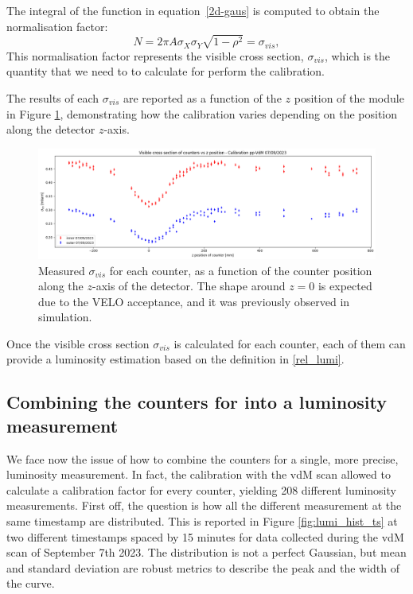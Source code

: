 The integral of the function in equation~\eqref{2d-gaus} is computed to obtain the normalisation factor: 
\begin{equation}
    N = 2\pi A \sigma_{X}\sigma_{Y}\sqrt {1-\rho ^{2}}=\sigma_{vis},\label{2d-gaus-norm}
\end{equation}
This normalisation factor represents the visible cross section, $\sigma_{vis}$, which is the quantity that we need to to calculate for perform the calibration.

 The results of each $\sigma_{vis}$ are reported as a function of the $z$ position of the module in Figure \ref{fig:coefficient_pos}, demonstrating how the calibration varies depending on the position along the detector $z$-axis.

\begin{figure}
    \centering
    \includegraphics[width=\textwidth]{figures/coefficient_pos.png}
    \caption{Measured $\sigma_{vis}$ for each counter, as a function of the counter position along the $z$-axis of the detector. The shape around $z=0$ is expected due to the VELO acceptance, and it was previously observed in simulation.}
    \label{fig:coefficient_pos}
\end{figure}

Once the visible cross section $\sigma_{vis}$ is calculated for each counter, each of them can provide a luminosity estimation based on the definition in \eqref{rel_lumi}.

\subsection{Combining the counters for into a luminosity measurement}
We face now the issue of how to combine the counters for a single, more precise, luminosity measurement. In fact, the calibration with the vdM scan allowed to calculate a calibration factor for every counter, yielding 208 different luminosity measurements. 
First off, the question is how all the different measurement at the same timestamp are distributed. 
This is reported in Figure \ref{fig:lumi_hist_ts} at two different timestamps spaced by 15 minutes for data collected during the vdM scan of September 7th 2023. The distribution is not a perfect Gaussian, but mean and standard deviation are robust metrics to describe the peak and the width of the curve. 


